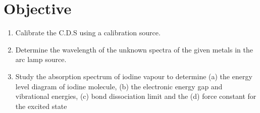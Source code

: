\section{Objective}

\begin{enumerate}
    \item Calibrate the C.D.S using a calibration source.
    \item Determine the wavelength of the unknown spectra of the given metals in the arc lamp source.
    \item Study the absorption spectrum of iodine vapour to determine (a) the energy level diagram of iodine molecule,
    (b) the electronic energy gap and vibrational energies,
    (c) bond dissociation limit and the
    (d) force constant for the excited state
\end{enumerate}